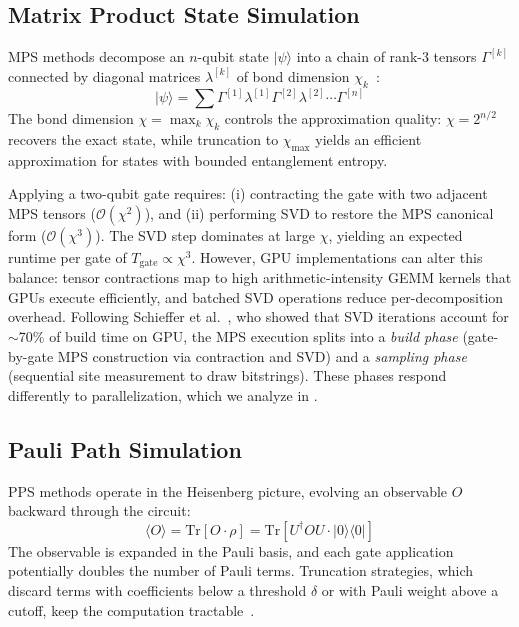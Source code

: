 \documentclass[conference,10pt]{IEEEtran}
\begin{document}
    \subsection{Matrix Product State Simulation}

    MPS methods decompose an $n$-qubit state $|\psi\rangle$ into a chain of rank-3 tensors $\Gamma^{[k]}$ connected by diagonal matrices $\lambda^{[k]}$ of bond dimension $\chi_{k}$~\cite{vidal2003efficient}:
    \begin{equation}
        |\psi\rangle = \sum \Gamma^{[1]} \lambda^{[1]} \Gamma^{[2]} \lambda^{[2]} \cdots \Gamma^{[n]}
    \end{equation}
    The bond dimension $\chi = \max_k \chi_k$ controls the approximation quality: $\chi = 2^{n/2}$ recovers the exact state, while truncation to $\chi_{\max}$ yields an efficient approximation for states with bounded entanglement entropy.
     
    Applying a two-qubit gate requires: (i) contracting the gate with two adjacent MPS tensors ($\mathcal{O}(\chi^{2})$), and (ii) performing SVD to restore the MPS canonical form ($\mathcal{O}(\chi^{3})$). The SVD step dominates at large $\chi$, yielding an expected runtime per gate of $T_{\text{gate}} \propto \chi^{3}$. However, GPU implementations can alter this balance: tensor contractions map to high arithmetic-intensity GEMM kernels that GPUs execute efficiently, and batched SVD operations reduce per-decomposition overhead. Following Schieffer et al.~\cite{schieffer2025harnessingcudaqsmpstensor}, who showed that SVD iterations account for $\sim$70\% of build time on GPU, the MPS execution splits into a \emph{build phase} (gate-by-gate MPS construction via contraction and SVD) and a \emph{sampling phase} (sequential site measurement to draw bitstrings). These phases respond differently to parallelization, which we analyze in .

    \subsection{Pauli Path Simulation}

    PPS methods operate in the Heisenberg picture, evolving an observable $O$ backward through the circuit:
    \begin{equation}
        \langle O \rangle = \text{Tr}[O \cdot \rho] = \text{Tr}[U^\dagger O U \cdot |0\rangle\langle 0|]
    \end{equation}
    The observable is expanded in the Pauli basis, and each gate application potentially doubles the number of Pauli terms. Truncation strategies, which discard terms with coefficients below a threshold $\delta$ or with Pauli weight above a cutoff, keep the computation tractable~\cite{begusic2024fast, aharonov2023polynomial}.
     
\end{document}
